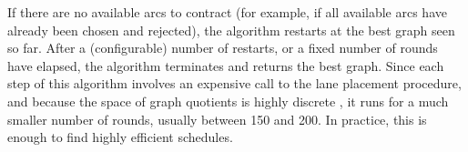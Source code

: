If there are no available arcs to contract (for example, if all available arcs have already been chosen and rejected), the algorithm restarts at the best graph seen so far.
After a (configurable) number of restarts, or a fixed number of rounds have elapsed, the algorithm terminates and returns the best graph.
Since each step of this algorithm involves an expensive call to the lane placement procedure, and because the space of graph quotients is highly discrete , it runs for a much smaller number of rounds, usually between 150 and 200.
In practice, this is enough to find highly efficient schedules.










